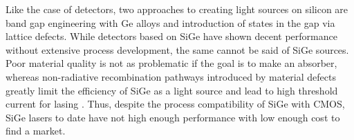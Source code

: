 \documentclass[twocolumn]{article}
\begin{document}
Like the case of detectors, two approaches to creating light sources on silicon are band gap engineering with Ge alloys and introduction of states in the gap via lattice defects. While detectors based on SiGe have shown decent performance without extensive process development, the same cannot be said of SiGe sources. Poor material quality is not as problematic if the goal is to make an absorber, whereas non-radiative recombination pathways introduced by material defects greatly limit the efficiency of SiGe as a light source and lead to high threshold current for lasing \cite{zhyi2015}. Thus, despite the process compatibility of SiGe with CMOS, SiGe lasers to date have not high enough performance with low enough cost to find a market. 
\end{document}

